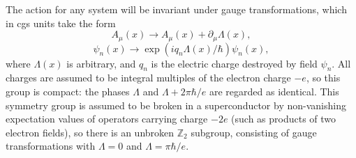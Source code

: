 The action for any system will be invariant under gauge transformations, which in cgs units take the form
\begin{equation}
A_\mu(x)\longrightarrow A_\mu(x)+\partial_\mu\Lambda(x),
\tag{21.6.1}\label{eq:21.6.1}
\end{equation}
\begin{equation}
\psi_n(x)\longrightarrow
\exp\!\left(iq_n\Lambda(x)/\hbar\right)\psi_n(x),
\tag{21.6.2}\label{eq:21.6.2}
\end{equation}
where $\Lambda(x)$ is arbitrary, and $q_n$ is the electric charge destroyed by field $\psi_n$. All charges are assumed to be integral multiples of the electron charge $-e$, so this group is compact: the phases $\Lambda$ and $\Lambda+2\pi\hbar/e$ are regarded as identical. This symmetry group is assumed to be broken in a superconductor by non-vanishing expectation values of operators carrying charge $-2e$ (such as products of two electron fields), so there is an unbroken $\mathbb Z_2$ subgroup, consisting of gauge transformations with $\Lambda=0$ and $\Lambda=\pi\hbar/e$.

